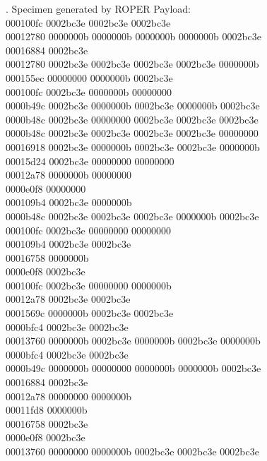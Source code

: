 \documentclass[9pt]{beamer}
\begin{document}
\begin{frame}{\theframenumber. Specimen generated by ROPER}
  Payload:
  \\
  
000100fc 0002bc3e 0002bc3e 0002bc3e \\
00012780 0000000b 0000000b 0000000b 0000000b 0002bc3e \\
00016884 0002bc3e \\
00012780 0002bc3e 0002bc3e 0002bc3e 0002bc3e 0000000b \\
000155ec 00000000 0000000b 0002bc3e \\
000100fc 0002bc3e 0000000b 00000000 \\
0000b49c 0002bc3e 0000000b 0002bc3e 0000000b 0002bc3e \\
0000b48c 0002bc3e 00000000 0002bc3e 0002bc3e 0002bc3e \\
0000b48c 0002bc3e 0002bc3e 0002bc3e 0002bc3e 00000000 \\
00016918 0002bc3e 0000000b 0002bc3e 0002bc3e 0000000b \\
00015d24 0002bc3e 00000000 00000000 \\
00012a78 0000000b 00000000 \\
0000e0f8 00000000 \\
000109b4 0002bc3e 0000000b \\
0000b48c 0002bc3e 0002bc3e 0002bc3e 0000000b 0002bc3e \\
000100fc 0002bc3e 00000000 00000000 \\
000109b4 0002bc3e 0002bc3e \\
00016758 0000000b \\
0000e0f8 0002bc3e \\
000100fc 0002bc3e 00000000 0000000b \\
00012a78 0002bc3e 0002bc3e \\
0001569c 0000000b 0002bc3e 0002bc3e \\
0000bfc4 0002bc3e 0002bc3e \\
00013760 0000000b 0002bc3e 0000000b 0002bc3e 0000000b \\
0000bfc4 0002bc3e 0002bc3e \\
0000b49c 0000000b 00000000 0000000b 0000000b 0002bc3e \\
00016884 0002bc3e \\
00012a78 00000000 0000000b \\
00011fd8 0000000b \\
00016758 0002bc3e \\
0000e0f8 0002bc3e \\
00013760 00000000 0000000b 0002bc3e 0002bc3e 0002bc3e \\

\end{frame}
\end{document}
